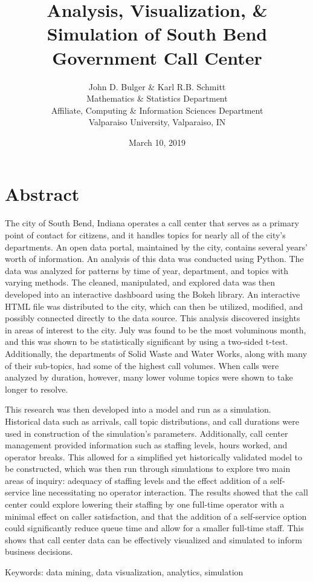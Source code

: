 \documentclass[12pt]{article}
\title{Analysis, Visualization, \& Simulation of South Bend Government Call Center}
\author{John D. Bulger \& Karl R.B. Schmitt\\
	Mathematics \& Statistics Department\\
	Affiliate, Computing \& Information Sciences Department
	\\Valparaiso University, Valparaiso, IN}
\date{March 10, 2019}
\begin{document}
	
\section*{Abstract}

The city of South Bend, Indiana operates a call center that serves as a primary point of contact for citizens, and it handles topics for nearly all of the city's departments.  An open data portal, maintained by the city, contains several years’ worth of information.  An analysis of this data was conducted using Python.  The data was analyzed for patterns by time of year, department, and topics with varying methods.  The cleaned, manipulated, and explored data was then developed into an interactive dashboard using the Bokeh library.  An interactive HTML file was distributed to the city, which can then be utilized, modified, and possibly connected directly to the data source.  This analysis discovered insights in areas of interest to the city.  July was found to be the most voluminous month, and this was shown to be statistically significant by using a two-sided t-test.  Additionally, the departments of Solid Waste and Water Works, along with many of their sub-topics, had some of the highest call volumes.  When calls were analyzed by duration, however, many lower volume topics were shown to take longer to resolve.

\par

This research was then developed into a model and run as a simulation.  Historical data such as arrivals, call topic distributions, and call durations were used in construction of the simulation's parameters.  Additionally, call center management provided information such as staffing levels, hours worked, and operator breaks.  This allowed for a simplified yet historically validated model to be constructed, which was then run through simulations to explore two main areas of inquiry:  adequacy of staffing levels and the effect addition of a self-service line necessitating no operator interaction.  The results showed that the call center could explore lowering their staffing by one full-time operator with a minimal effect on caller satisfaction, and that the addition of a self-service option could significantly reduce queue time and allow for a smaller full-time staff.  This shows that call center data can be effectively visualized and simulated to inform business decisions.

\par

Keywords:  data mining, data visualization, analytics, simulation

 
\end{document}
